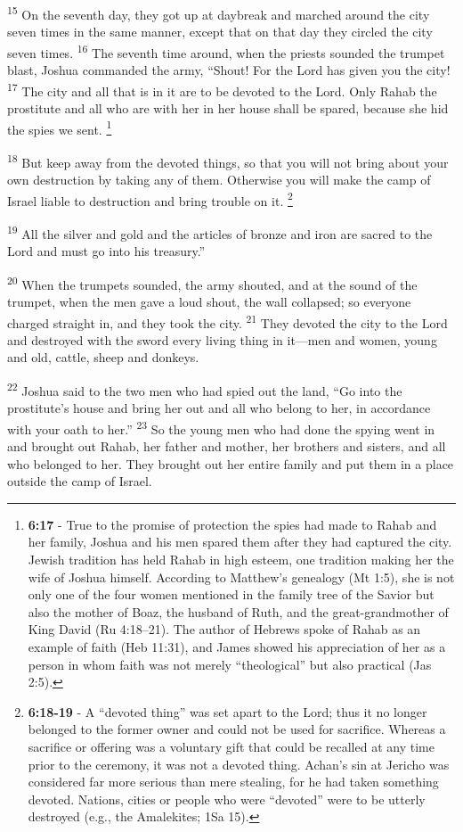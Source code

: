 \documentclass[12pt,twoside]{article}
\newcommand{\vs}[1]{\textsuperscript{#1}}
\newcommand{\vnote}[2]{%
  \begingroup
  \renewcommand\thefootnote{}%
  \footnote{\scriptsize \textbf{}#2}%
  \addtocounter{footnote}{-1}%
  \endgroup
}
\begin{document}
\vs{15} On the seventh day, they got up at daybreak and marched around the city seven times in the same manner, except that on that day they circled the city seven times.
\vs{16} The seventh time around, when the priests sounded the trumpet blast, Joshua commanded the army, ``Shout! For the Lord has given you the city!
\vs{17} The city and all that is in it are to be devoted to the Lord. Only Rahab the prostitute and all who are with her in her house shall be spared, because she hid the spies we sent.\vnote{17}{\textbf{6:17} - True to the promise of protection the spies had made to Rahab and her family, Joshua and his men spared them after they had captured the city. Jewish tradition has held Rahab in high esteem, one tradition making her the wife of Joshua himself. According to Matthew’s genealogy (Mt 1:5), she is not only one of the four women mentioned in the family tree of
the Savior but also the mother of Boaz, the husband of Ruth, and the great-grandmother of King David (Ru 4:18–21). The author of Hebrews spoke of Rahab as an example of faith (Heb 11:31), and James showed his appreciation of her as a
person in whom faith was not merely “theological” but also practical (Jas 2:5).}
\vs{18} But keep away from the devoted things, so that you will not bring about your own destruction by taking any of them. Otherwise you will make the camp of Israel liable to destruction and bring trouble on it.\vnote{18}{\textbf{6:18-19} - A “devoted thing” was set apart to the Lord; thus it no longer belonged to the former owner and could not be used for sacrifice. Whereas a sacrifice or offering was a voluntary gift that could be recalled at any time prior to the ceremony, it was not a devoted thing. Achan’s sin at Jericho was considered far more serious than mere stealing, for he had taken something devoted. Nations, cities or people who were “devoted” were to be utterly destroyed (e.g., the Amalekites; 1Sa 15).}
\vs{19} All the silver and gold and the articles of bronze and iron are sacred to the Lord and must go into his treasury.''

\vs{20} When the trumpets sounded, the army shouted, and at the sound of the trumpet, when the men gave a loud shout, the wall collapsed; so everyone charged straight in, and they took the city.
\vs{21} They devoted the city to the Lord and destroyed with the sword every living thing in it---men and women, young and old, cattle, sheep and donkeys.

\vs{22} Joshua said to the two men who had spied out the land, ``Go into the prostitute's house and bring her out and all who belong to her, in accordance with your oath to her.''
\vs{23} So the young men who had done the spying went in and brought out Rahab, her father and mother, her brothers and sisters, and all who belonged to her. They brought out her entire family and put them in a place outside the camp of Israel.
\end{document}

